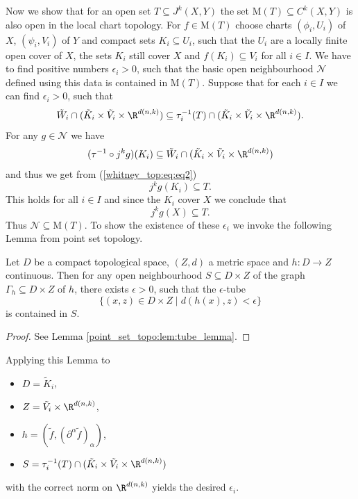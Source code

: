 Now we show that for an open set $T \subseteq J^k(X,Y)$ the set $\mathrm{M}(T) \subseteq C^k(X,Y)$ is also open in the local chart topology. For $f \in \mathrm{M}(T)$ choose charts $(\phi_i,U_i)$ of $X$, $(\psi_i,V_i)$ of $Y$ and compact sets $K_i \subseteq U_i$, such that the $U_i$ are a locally finite open cover of $X$, the sets $K_i$ still cover $X$ and $f(K_i) \subseteq V_i$ for all $i \in I$. We have to find positive numbers $\epsilon_i > 0$, such that the basic open neighbourhood $\mathcal{N}$ defined using this data is contained in $\mathrm{M}(T)$. Suppose that for each $i \in I$ we can find $\epsilon_i >0$, such that 
\begin{equation}
    \label{whitney_top:eq:eq2}
    \tilde{W}_i \cap (\tilde{K}_i \times \tilde{V}_i \times \R^{d(n,k)}) \subseteq \tau_i^{-1}(T) \cap (\tilde{K}_i \times \tilde{V}_i \times \R^{d(n,k)}).
\end{equation}
For any $g \in \mathcal{N}$ we have 
\[
(\tau^{-1}\circ j^kg)(K_i) \subseteq \tilde{W}_i \cap (\tilde{K}_i \times \tilde{V}_i \times \R^{d(n,k)}) 
\]
and thus we get from (\ref{whitney_top:eq:eq2})
\[
j^kg(K_i) \subseteq T.
\] 
This holds for all $i \in I$ and since the $K_i$ cover $X$ we conclude that 
\[
j^kg(X) \subseteq T.
\]
Thus $\mathcal{N} \subseteq \mathrm{M}(T)$. To show the existence of these $\epsilon_i$ we invoke the following Lemma from point set topology.

\begin{lemma}
    Let $D$ be a compact topological space, $(Z,d)$ a metric space and $h \colon D \to Z$ continuous. Then for any open neighbourhood $S \subseteq D \times Z$ of the graph $\Gamma_h \subseteq D \times Z$ of $h$, there exists $\epsilon >0$, such that the $\epsilon$-tube 
    \[
    \{
        (x,z) \in D \times Z \mid d(h(x),z) < \epsilon
    \}
    \]
    is contained in $S$.
\end{lemma}

\begin{proof}
    See Lemma \ref{point_set_topo:lem:tube_lemma}.
\end{proof}
\noindent Applying this Lemma to 
\begin{itemize}
\item $D = \tilde{K}_i$,
\item $Z=\tilde{V}_i \times \R^{d(n,k)}$,
\item $h = (\tilde{f}, (\partial^\alpha\tilde{f})_\alpha)$,
\item $S = \tau_i^{-1}(T) \cap (\tilde{K}_i \times \tilde{V}_i \times \R^{d(n,k)})$
\end{itemize}
with the correct norm on $\R^{d(n,k)}$ yields the desired $\epsilon_i$.





